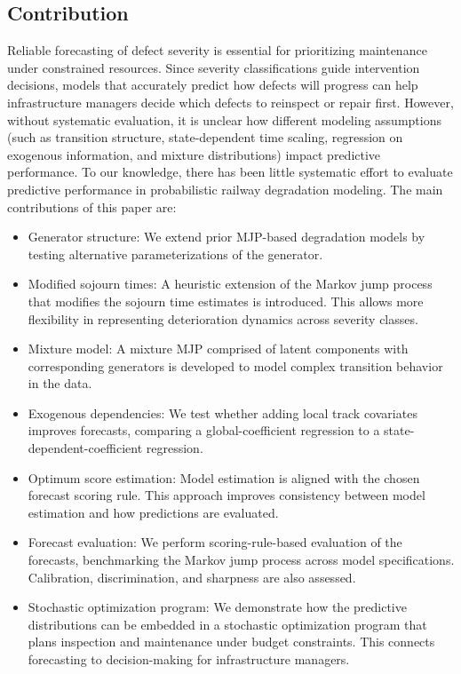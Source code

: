 \subsection{Contribution}
Reliable forecasting of defect severity is essential for prioritizing maintenance under constrained resources. Since severity classifications guide intervention decisions, models that accurately predict how defects will progress can help infrastructure managers decide which defects to reinspect or repair first. However, without systematic evaluation, it is unclear how different modeling assumptions (such as transition structure, state-dependent time scaling, regression on exogenous information, and mixture distributions) impact predictive performance. To our knowledge, there has been little systematic effort to evaluate predictive performance in probabilistic railway degradation modeling. 
The main contributions of this paper are:

\begin{itemize}
    \item Generator structure: We extend prior MJP-based degradation models by testing alternative parameterizations of the generator.    
    \item Modified sojourn times: A heuristic extension of the Markov jump process that modifies the sojourn time estimates is introduced. This allows more flexibility in representing deterioration dynamics across severity classes.
      \item Mixture model: A mixture MJP comprised of latent components with corresponding generators is developed to model complex transition behavior in the data.
    \item Exogenous dependencies: We test whether adding local track covariates improves forecasts, comparing a global-coefficient regression to a state-dependent-coefficient regression.
     \item Optimum score estimation: Model estimation is aligned with the chosen forecast scoring rule. This approach improves consistency between model estimation and how predictions are evaluated.
     \item Forecast evaluation: We perform scoring-rule-based evaluation of the forecasts, benchmarking the Markov jump process across model specifications. Calibration, discrimination, and sharpness are also assessed. %
    \item Stochastic optimization program: We demonstrate how the predictive distributions can be embedded in a stochastic optimization program that plans inspection and maintenance under budget constraints. This connects forecasting to decision-making for infrastructure managers.
\end{itemize}


